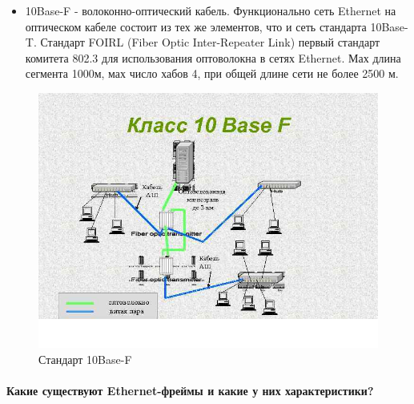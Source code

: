 \begin{itemize}
\item 10Base-F - волоконно-оптический кабель. Функционально сеть Ethernet на
оптическом кабеле состоит из тех же элементов, что и сеть стандарта 10Base- T. Стандарт FOIRL (Fiber Optic Inter-Repeater Link) первый стандарт комитета
802.3 для использования оптоволокна в сетях Ethernet. Мах длина сегмента 1000м, мах число хабов 4, при общей длине сети не более 2500 м.
\end{itemize}
\begin{figure}[H]
    \begin{center}
	    \includegraphics[scale=0.5]{fig/10Base-F.png}
	    \caption{Стандарт 10Base-F}
	    \label{pic:10Base-F} %
    \end{center}
\end{figure}

\paragraph{Какие существуют Ethernet-фреймы и какие у них характеристики?}

